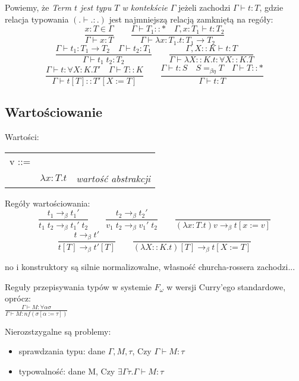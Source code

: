 \documentclass[11pt,leqno]{article}
\begin{document}
\begin{definicja}
	Powiemy, że \emph{Term $t$ jest typu $T$ w kontekście $\Gamma$} jeżeli zachodzi $\Gamma \vdash t : T$, gdzie
	relacja typowania $(.\vdash.:.)$ jest najmniejszą relacją zamkniętą na regóły:
	\[
		\frac{x:T \in \Gamma}{\Gamma \vdash x : T}
		\qquad
		\frac{\Gamma\vdash T_1::* \quad \Gamma,x:T_1\vdash t:T_2}{\Gamma\vdash \lambda x:T_1.t : T_1 \rightarrow T_2}
	\]
	\[
		\frac{\Gamma\vdash t_1 : T_1 \rightarrow T_2 \quad \Gamma\vdash t_2 : T_1}{\Gamma\vdash t_1\;t_2 : T_2}
		\qquad
		\frac{\Gamma,X::K\vdash t:T}{\Gamma\vdash \lambda X::K.t : \forall X::K.T}
	\]
	\[
		\frac{\Gamma\vdash t : \forall X:K.T' \quad \Gamma\vdash T::K}{\Gamma\vdash t[T]::T'[X := T]}
		\qquad
		\frac{\Gamma\vdash t:S \quad S=_{\beta\eta}T \quad \Gamma\vdash T::*}{\Gamma\vdash t:T}
	\]
\end{definicja}

\subsection{Wartościowanie}

Wartości:

\begin{tabular}{ l c r }
  v ::= & & \\
   & $\lambda x:T.t$ & \textit{wartość abstrakcji} \\
\end{tabular}

Regóły wartościowania:
\[
	\frac{t_1 \longrightarrow_\beta t_1'}{t_1\;t_2 \longrightarrow_\beta t_1'\;t_2}
	\qquad
	\frac{t_2 \longrightarrow_\beta t_2'}{v_1\;t_2 \longrightarrow_\beta v_1'\;t_2}
	\qquad
	\frac{}{(\lambda x:T.t)v \longrightarrow_\beta t[x:=v]}
\]
\[
	\frac{t \longrightarrow_\beta t'}{t[T] \longrightarrow_\beta t'[T]}
	\qquad
	\frac{}{(\lambda X::K.t)[T] \longrightarrow_\beta t[X:=T]}
\]

no i konstruktory są silnie normalizowalne, własność churcha-rossera zachodzi...

\begin{definicja}
Reguły przepisywania typów w systemie $F_{\omega}$ w wersji Curry'ego standardowe, oprócz: \\

$\frac{\Gamma \vdash M : \forall \alpha \sigma}{\Gamma \vdash M : nf(\sigma [ \alpha := \tau ])}$

\end{definicja}


Nierozstzygalne są problemy:
    \begin{itemize}
        \item sprawdzania typu: dane $\Gamma, M, \tau$, Czy $\Gamma \vdash M : \tau$
        \item typowalność: dane M, Czy $\exists \Gamma \tau . \Gamma \vdash M : \tau$
    \end{itemize}
\end{document}
